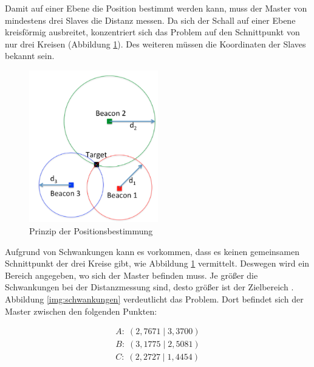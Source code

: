 Damit auf einer Ebene die Position bestimmt werden kann, muss der Master von mindestens drei Slaves die Distanz messen. Da sich der Schall auf einer Ebene kreisförmig ausbreitet, konzentriert sich das Problem auf den Schnittpunkt von nur drei Kreisen (Abbildung \ref{img:positionsbestimmung}). Des weiteren müssen die Koordinaten der Slaves bekannt sein.
\begin{figure}[H]
        \centering
        \includegraphics[width=0.5\textwidth]{images/positionsbestimmung.png}
        \caption{Prinzip der Positionsbestimmung}
        \label{img:positionsbestimmung}
\end{figure}
Aufgrund von Schwankungen kann es vorkommen, dass es keinen gemeinsamen Schnittpunkt der drei Kreise gibt, wie Abbildung \ref{img:positionsbestimmung} vermittelt. Deswegen wird ein Bereich angegeben, wo sich der Master befinden muss. Je größer die Schwankungen bei der Distanzmessung sind, desto größer ist der Zielbereich \cite{src_MATH_TDOA}. Abbildung \ref{img:schwankungen} verdeutlicht das Problem. Dort befindet sich der Master zwischen den folgenden Punkten:

\begin{equation}
\begin{split}
A: \; (2,7671\;|\;3,3700) \\
B: \; (3,1775\;|\;2,5081) \\
C: \; (2,2727\;|\;1,4454)
\end{split}
\end{equation}


